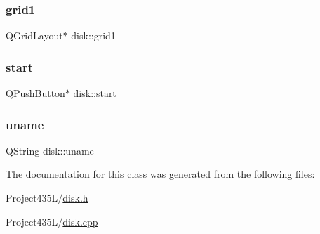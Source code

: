 \mbox{\label{classdisk_a19f7522d08f9644b731fa1a175825af9}} 
\subsubsection{\texorpdfstring{grid1}{grid1}}
{\footnotesize\ttfamily Q\+Grid\+Layout$\ast$ disk\+::grid1\hspace{0.3cm}{\ttfamily [private]}}

\mbox{\label{classdisk_a9e1746eb3b2679d99de542100a8d6a93}} 
\subsubsection{\texorpdfstring{start}{start}}
{\footnotesize\ttfamily Q\+Push\+Button$\ast$ disk\+::start\hspace{0.3cm}{\ttfamily [private]}}

\mbox{\label{classdisk_a16c51fecafdb4e1297d598545acc6cbc}} 
\subsubsection{\texorpdfstring{uname}{uname}}
{\footnotesize\ttfamily Q\+String disk\+::uname\hspace{0.3cm}{\ttfamily [private]}}



The documentation for this class was generated from the following files\+:\begin{DoxyCompactItemize}
\item 
Project435\+L/\hyperlink{disk_8h}{disk.\+h}\item 
Project435\+L/\hyperlink{disk_8cpp}{disk.\+cpp}\end{DoxyCompactItemize}
